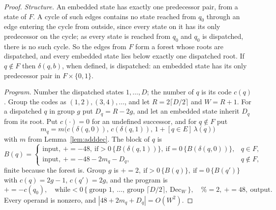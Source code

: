 \documentclass[11pt]{article}
\theoremstyle{remark}
\begin{document}
\begin{proof}
\emph{Structure.}  An embedded state has exactly one predecessor pair, from a state of
$F$.  A cycle of such edges contains no state reached from $q_0$ through an edge
entering the cycle from outside, since every state on it has its only predecessor on
the cycle; as every state is reached from $q_0$ and $q_0$ is dispatched, there is no
such cycle.  So the edges from $F$ form a forest whose roots are dispatched, and
every embedded state lies below exactly one dispatched root.  If $q\notin F$ then
$\delta(q,b)$, when defined, is dispatched: an embedded state has its only
predecessor pair in $F\times\{0,1\}$.

\emph{Program.}  Number the dispatched states $1,\dots,D$; the number of $q$ is its
code $c(q)$.  Group the codes as $(1,2),(3,4),\dots$, and let $R=2\lceil D/2\rceil$ and
$W=R+1$.  For a dispatched $q$ in group $g$ put $D_q=R-2g$, and let an embedded state
inherit $D_q$ from its root.  Put $c(\cdot)=0$ for an undefined successor, and for
$q\notin F$ put
\[
  m_q=m\bigl(c(\delta(q,0)),\,c(\delta(q,1)),\,1+[q\in E]\,\lambda(q)\bigr)
\]
with $m$ from Lemma~\ref{lem:adddec}.  The block of $q$ is
\[
 B(q)=\begin{cases}
 \text{input},\ \mathord{+}\!=-48,\ \text{if}>0\,\{B(\delta(q,1))\},\
   \text{if}=0\,\{B(\delta(q,0))\}, & q\in F,\\
 \text{input},\ \mathord{+}\!=-48-2m_q-D_q, & q\notin F,
 \end{cases}
\]
finite because the forest is.  Group $g$ is
$\mathord{+}\!=2,\ \text{if}>0\,\{B(q)\},\ \text{if}=0\,\{B(q')\}$ with
$c(q)=2g-1$, $c(q')=2g$, and the program is
\[
 \mathord{+}\!=-c(q_0),\quad
 \text{while}<0\,\{\ \text{group }1,\ \dots,\ \text{group }\lceil D/2\rceil,\
   \mathrm{Dec}_W\ \},\quad
 \mathord{\%}\!=2,\ \mathord{+}\!=48,\ \text{output}.
\]
Every operand is nonzero, and $|48+2m_q+D_q|=O(W^2)$.


\end{proof}
\end{document}
